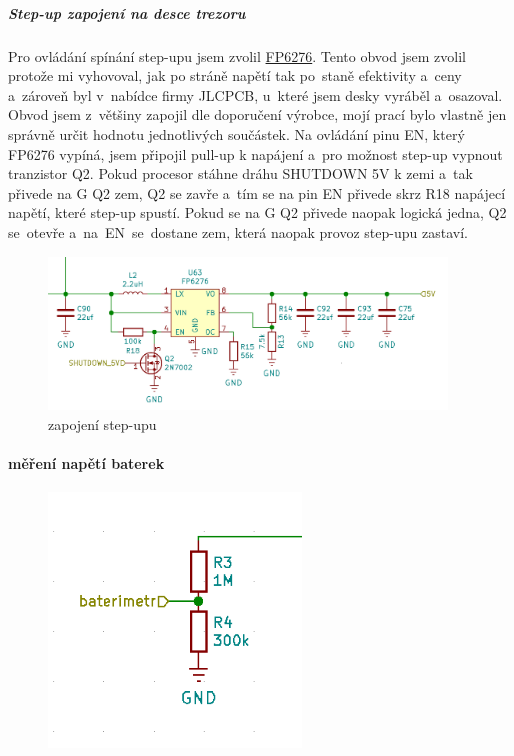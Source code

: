 \subparagraph*{Step-up zapojení na desce trezoru}
Pro ovládání spínání step-upu jsem zvolil \href{https://datasheet.lcsc.com/szlcsc/Feeling-Tech-FP6276AXR-G1_C83308.pdf}{FP6276}.
Tento obvod jsem zvolil protože mi vyhovoval, jak po stráně napětí tak po~staně efektivity a~ceny a~zároveň byl v~nabídce firmy JLCPCB,
u~které jsem desky vyráběl a~osazoval. 
Obvod jsem z~většiny zapojil dle doporučení výrobce, mojí prací bylo vlastně jen správně určit hodnotu 
jednotlivých součástek. Na ovládání pinu EN, který FP6276 vypíná, jsem připojil pull-up k napájení a~pro možnost step-up vypnout tranzistor Q2. 
Pokud procesor stáhne dráhu SHUTDOWN 5V k zemi a~tak přivede na G Q2 zem, Q2 se zavře a~tím se na pin EN přivede skrz R18 napájecí napětí, 
které step-up spustí. Pokud se na G Q2 přivede naopak logická jedna, Q2 se~otevře a~na~EN~se~dostane zem, která naopak provoz step-upu zastaví.

\begin{figure}[htbp]
    \centering
    \includegraphics[width=400]{kapitoly/obrazky/E4/napajeni/step-up.png}
    \caption{zapojení step-upu}
    \label{fig:E4-step-up}
\end{figure}

\newpage

\paragraph*{měření napětí baterek}

\begin{figure}
    \centering
    \includegraphics[width=0.6\textwidth]{kapitoly/obrazky/E4/napajeni/delic_baterimetru.png}
    \caption{\label{fig:frog1}}
\end{figure}

